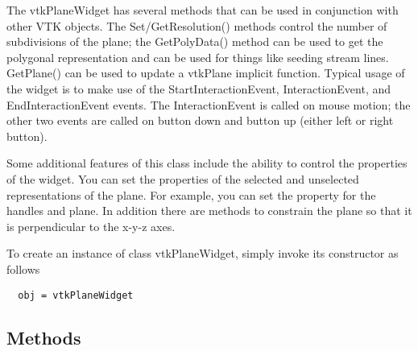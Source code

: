  The vtkPlaneWidget has several methods that can be used in conjunction
 with other VTK objects. The Set/GetResolution() methods control the number
 of subdivisions of the plane; the GetPolyData() method can be used to get
 the polygonal representation and can be used for things like seeding
 stream lines. GetPlane() can be used to update a vtkPlane implicit
 function. Typical usage of the widget is to make use of the
 StartInteractionEvent, InteractionEvent, and EndInteractionEvent
 events. The InteractionEvent is called on mouse motion; the other two
 events are called on button down and button up (either left or right
 button).

 Some additional features of this class include the ability to control the
 properties of the widget. You can set the properties of the selected and
 unselected representations of the plane. For example, you can set the
 property for the handles and plane. In addition there are methods to
 constrain the plane so that it is perpendicular to the x-y-z axes.

To create an instance of class vtkPlaneWidget, simply
invoke its constructor as follows
\begin{verbatim}
  obj = vtkPlaneWidget
\end{verbatim}
\subsection{Methods}

